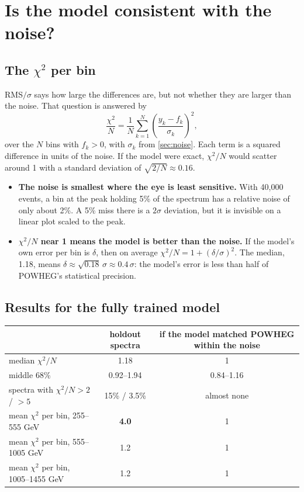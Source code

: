 \documentclass[11pt]{article}
\begin{document}
\section{Is the model consistent with the noise?}
\label{sec:chi2}

\subsection{The $\chi^2$ per bin}

RMS$/\sigma$ says how large the differences are, but not whether they are larger than
the noise. That question is answered by
\[
  \frac{\chi^2}{N} = \frac{1}{N}\sum_{k=1}^{N} \left( \frac{y_k - f_k}{\sigma_k} \right)^2 ,
\]
over the $N$ bins with $f_k > 0$, with $\sigma_k$ from \cref{sec:noise}. Each term is a
squared difference in units of the noise. If the model were exact, $\chi^2/N$ would
scatter around 1 with a standard deviation of $\sqrt{2/N} \approx 0.16$.

\begin{aside}
\begin{itemize}
  \item \textbf{The noise is smallest where the eye is least sensitive.} With 40,000
  events, a bin at the peak holding 5\% of the spectrum has a relative noise of only
  about 2\%. A 5\% miss there is a $2\sigma$ deviation, but it is invisible on a linear
  plot scaled to the peak.
  \item \textbf{$\chi^2/N$ near 1 means the model is better than the noise.} If the
  model's own error per bin is $\delta$, then on average $\chi^2/N = 1 + (\delta/\sigma)^2$.
  The median, 1.18, means $\delta \approx \sqrt{0.18}\,\sigma \approx 0.4\,\sigma$: the
  model's error is less than half of POWHEG's statistical precision.
\end{itemize}
\end{aside}

\subsection{Results for the fully trained model}

\begin{center}
\small
\begin{tabular}{lcc}
\toprule
 & holdout spectra & if the model matched POWHEG within the noise\\
\midrule
median $\chi^2/N$ & 1.18 & 1\\
middle 68\% & 0.92--1.94 & 0.84--1.16\\
spectra with $\chi^2/N > 2$ / $> 5$ & 15\% / 3.5\% & almost none\\
mean $\chi^2$ per bin, 255--555 GeV & \textbf{4.0} & 1\\
mean $\chi^2$ per bin, 555--1005 GeV & 1.2 & 1\\
mean $\chi^2$ per bin, 1005--1455 GeV & 1.2 & 1\\
\bottomrule
\end{tabular}
\end{center}
\end{document}
